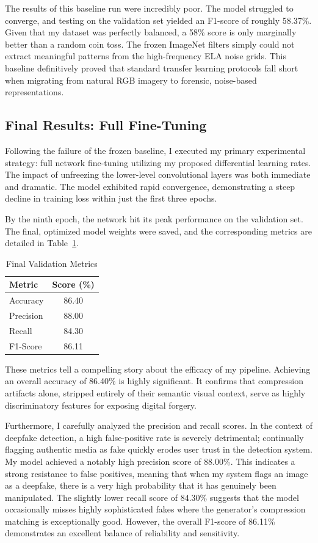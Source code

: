 The results of this baseline run were incredibly poor. The model struggled to converge, and testing on the validation set yielded an F1-score of roughly 58.37\%. Given that my dataset was perfectly balanced, a 58\% score is only marginally better than a random coin toss. The frozen ImageNet filters simply could not extract meaningful patterns from the high-frequency ELA noise grids. This baseline definitively proved that standard transfer learning protocols fall short when migrating from natural RGB imagery to forensic, noise-based representations.

\subsection{Final Results: Full Fine-Tuning}

Following the failure of the frozen baseline, I executed my primary experimental strategy: full network fine-tuning utilizing my proposed differential learning rates. The impact of unfreezing the lower-level convolutional layers was both immediate and dramatic. The model exhibited rapid convergence, demonstrating a steep decline in training loss within just the first three epochs.

By the ninth epoch, the network hit its peak performance on the validation set. The final, optimized model weights were saved, and the corresponding metrics are detailed in Table~\ref{tab:results}.

\begin{table}[h]
\centering
\caption{Final Validation Metrics}
\label{tab:results}
\begin{tabular}{@{}lc@{}}
\toprule
\textbf{Metric} & \textbf{Score (\%)} \\ \midrule
Accuracy & 86.40 \\
Precision & 88.00 \\
Recall & 84.30 \\
F1-Score & 86.11 \\ \bottomrule
\end{tabular}
\end{table}

These metrics tell a compelling story about the efficacy of my pipeline. Achieving an overall accuracy of 86.40\% is highly significant. It confirms that compression artifacts alone, stripped entirely of their semantic visual context, serve as highly discriminatory features for exposing digital forgery.

Furthermore, I carefully analyzed the precision and recall scores. In the context of deepfake detection, a high false-positive rate is severely detrimental; continually flagging authentic media as fake quickly erodes user trust in the detection system. My model achieved a notably high precision score of 88.00\%. This indicates a strong resistance to false positives, meaning that when my system flags an image as a deepfake, there is a very high probability that it has genuinely been manipulated. The slightly lower recall score of 84.30\% suggests that the model occasionally misses highly sophisticated fakes where the generator's compression matching is exceptionally good. However, the overall F1-score of 86.11\% demonstrates an excellent balance of reliability and sensitivity.
